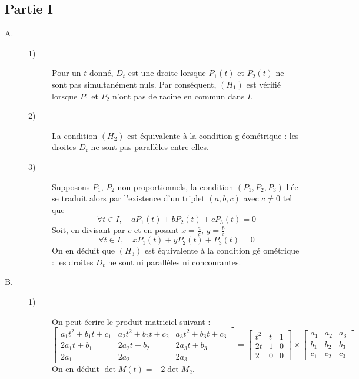 
\subsection{Partie I}

\begin{description}
\item[A.] 
\begin{description}
\item[1)]  Pour un $t$ donn\'{e}, $D_{t}$ est une droite lorsque $P_{1}(t)$
et $P_{2}(t)$ ne sont pas simultan\'{e}ment nuls. Par cons\'{e}quent, $%
(H_{1})$ est v\'{e}rifi\'{e} lorsque $P_{1}$ et $P_{2}$ n'ont pas de racine
en commun dans $I$.

\item[2)]  La condition $(H_{2})$ est \'{e}quivalente \`{a} la condition g%
\'{e}om\'{e}trique : les droites $D_{t}$ ne sont pas parall\`{e}les entre
elles.

\item[3)]  Supposons $P_{1}$, $P_{2}$ non proportionnels, la condition $%
(P_{1},P_{2},P_{3})$ li\'{e}e se traduit alors par l'existence d'un triplet $%
(a,b,c)$ avec $c\neq 0$ tel que 
\[
\forall t\in I,\quad aP_{1}(t)+bP_{2}(t)+cP_{3}(t)=0
\]
Soit, en divisant par $c$ et en posant $x=\frac{a}{c}$, $y=\frac{b}{c}$%
\[
\forall t\in I,\quad xP_{1}(t)+yP_{2}(t)+P_{3}(t)=0
\]
On en d\'{e}duit que $(H_{3})$ est \'{e}quivalente \`{a} la condition g\'{e}%
om\'{e}trique : les droites $D_{t}$ ne sont ni parall\`{e}les ni
concourantes.
\end{description}

\item[B.] 
\begin{description}
\item[1)]  On peut \'{e}crire le produit matriciel suivant :
\[
\left[ 
\begin{array}{ccc}
a_{1}t^{2}+b_{1}t+c_{1} & a_{2}t^{2}+b_{2}t+c_{2} & a_{3}t^{2}+b_{3}t+c_{3}
\\ 
2a_{1}t+b_{1} & 2a_{2}t+b_{2} & 2a_{3}t+b_{3} \\ 
2a_{1} & 2a_{2} & 2a_{3}
\end{array}
\right] =\left[ 
\begin{array}{ccc}
t^{2} & t & 1 \\ 
2t & 1 & 0 \\ 
2 & 0 & 0
\end{array}
\right] \times \left[ 
\begin{array}{ccc}
a_{1} & a_{2} & a_{3} \\ 
b_{1} & b_{2} & b_{3} \\ 
c_{1} & c_{2} & c_{3}
\end{array}
\right] 
\]
On en d\'{e}duit $\det M(t)=-2\det M_{2}$.


\end{description}
\end{description}
